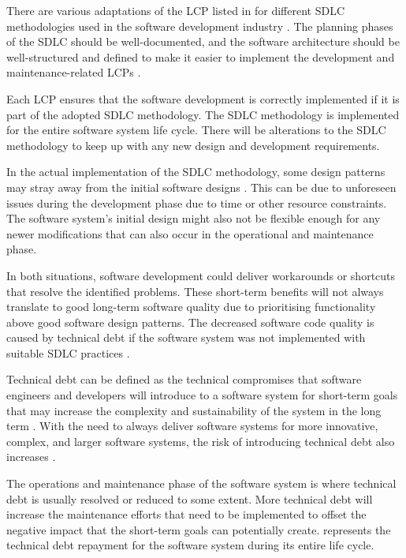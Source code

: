 There are various adaptations of the LCP listed in  for different SDLC methodologies used in the software development industry \cite{Al-Saiyd2015}. The planning phases of the SDLC should be well-documented, and the software architecture should be well-structured and defined to make it easier to implement the development and maintenance-related LCPs \cite{Ackermann2009}.\par Each LCP ensures that the software development is correctly implemented if it is part of the adopted SDLC methodology. The SDLC methodology is implemented for the entire software system life cycle. There will be alterations to the SDLC methodology to keep up with any new design and development requirements.\par In the actual implementation of the SDLC methodology, some design patterns may stray away from the initial software designs \cite{Reimanis2016}. This can be due to unforeseen issues during the development phase due to time or other resource constraints. The software system's initial design might also not be flexible enough for any newer modifications that can also occur in the operational and maintenance phase.\par In both situations, software development could deliver workarounds or shortcuts that resolve the identified problems. These short-term benefits will not always translate to good long-term software quality due to prioritising functionality above good software design patterns. The decreased software code quality is caused by technical debt if the software system was not implemented with suitable SDLC practices \cite{DeLeon-Sigg2020, Reimanis2016}.\par Technical debt can be defined as the technical compromises that software engineers and developers will introduce to a software system for short-term goals that may increase the complexity and sustainability of the system in the long term \cite{Snipes2018, Gralha2018}. With the need to always deliver software systems for more innovative, complex, and larger software systems, the risk of introducing technical debt also increases \cite{Reimanis2016, Khan2013}.\par The operations and maintenance phase of the software system is where technical debt is usually resolved or reduced to some extent. More technical debt will increase the maintenance efforts that need to be implemented to offset the negative impact that the short-term goals can potentially create.  represents the technical debt repayment for the software system during its entire life cycle.


